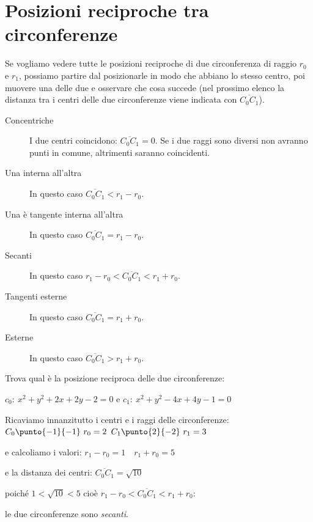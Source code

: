 \section{Posizioni reciproche tra circonferenze}
\label{sec:circ_posizionireciproche}

Se vogliamo vedere tutte le posizioni reciproche di due circonferenza  
di raggio \(r_0\) e \(r_1\), possiamo partire dal posizionarle in modo che 
abbiano lo stesso centro, poi muovere una delle due e osservare che cosa 
succede (nel prossimo elenco la distanza tra i centri delle due circonferenze 
viene indicata con \(\overline{C_0 C_1}\)).

\begin{description} %
 \item [Concentriche]
I due centri coincidono: \(\overline{C_0 C_1} = 0\).
Se i due raggi sono diversi non avranno punti in comune, altrimenti saranno 
coincidenti.
 \item [Una interna all'altra]
In questo caso \(\overline{C_0 C_1} < r_1 - r_0\).
 \item [Una è tangente interna all'altra]
In questo caso \(\overline{C_0 C_1} = r_1 - r_0\).
 \item [Secanti]
In questo caso \(r_1 - r_0 < \overline{C_0 C_1} < r_1 + r_0\).
 \item [Tangenti esterne]
In questo caso \(\overline{C_0 C_1} = r_1 + r_0\).
 \item [Esterne]
In questo caso \(\overline{C_0 C_1} > r_1 + r_0\).
\end{description}

\newpage %

\begin{esempio}
Trova qual è la posizione reciproca delle due circonferenze:

\(c_0:~x^2 + y^2 +2x +2y -2 = 0\) e \(c_1:~x^2 + y^2 -4x +4y -1 = 0\) 

Ricaviamo innanzitutto i centri e i raggi delle circonferenze: \\
\(C_0 \punto{-1}{-1} ~ r_0 = 2\) \qquad 
\(C_1 \punto{2}{-2} ~ r_1 = 3\) 

e calcoliamo i valori: \quad \(r_1 - r_0 = 1 \quad r_1 + r_0 = 5\) 

e la distanza dei centri: \quad \(\overline{C_0 C_1} = \sqrt{10}\) 

poiché \quad \(1 < \sqrt{10} < 5\) cioè \quad 
\(r_1 - r_0 < \overline{C_0 C_1} < r_1 + r_0\): 

le due circonferenze sono \emph{secanti}.
\end{esempio}

